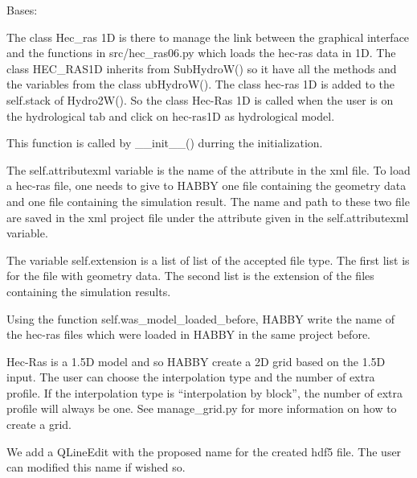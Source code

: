 \documentclass[letterpaper,10pt,english]{sphinxmanual}
\begin{document}
\begin{fulllineitems}
\label{\detokenize{index:src_GUI.hydro_GUI_2.HEC_RAS1D}}
Bases: {\hyperref[\detokenize{index:src_GUI.hydro_GUI_2.SubHydroW}]{}}

The class Hec\_ras 1D is there to manage the link between the graphical interface and the functions in
src/hec\_ras06.py which loads the hec-ras data in 1D. The class HEC\_RAS1D inherits from SubHydroW() so it have all
the methods and the variables from the class ubHydroW(). The class hec-ras 1D is added to the self.stack of Hydro2W(). So the class Hec-Ras 1D is called when
the user is on the hydrological tab and click on hec-ras1D as hydrological model.

\begin{fulllineitems}
\label{\detokenize{index:src_GUI.hydro_GUI_2.HEC_RAS1D.init_iu}}
This function is called by \_\_init\_\_() durring the initialization.


The self.attributexml variable is the name of the attribute in the xml file. To load a hec-ras file, one needs
to give to HABBY one file containing the geometry data and one file containing the simulation result. The name
and path to  these two file are saved in the xml project file under the attribute given in
the self.attributexml variable.

The variable self.extension is a list of list of the accepted file type. The first list is for the file
with geometry data. The second list is the extension of the files containing the simulation results.

Using the function self.was\_model\_loaded\_before, HABBY write the name of the hec-ras files which were loaded
in HABBY in the same project before.

Hec-Ras is a 1.5D model and so HABBY create a 2D grid based on the 1.5D input. The user can choose the interpolation
type and the number of extra profile. If the interpolation type is “interpolation by block”, the number of extra
profile will always be one. See manage\_grid.py for more information on how to create a grid.

We add a QLineEdit with the proposed name for the created hdf5 file. The user can modified this name if wished so.


\end{fulllineitems}
\end{fulllineitems}
\end{document}
